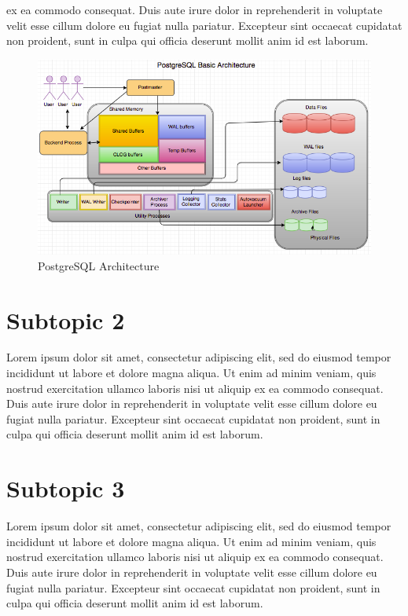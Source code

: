 \documentclass[a4paper,12 pt,oneside]{book}
\begin{document}
ex ea commodo consequat. Duis aute irure dolor in reprehenderit in voluptate velit esse cillum dolore eu fugiat nulla pariatur. Excepteur sint occaecat cupidatat non proident, sunt in culpa qui officia deserunt mollit anim id est laborum.

\begin{figure}[h]
    \centering
    \includegraphics[width=\textwidth]{images/pg.png}
    \caption{PostgreSQL Architecture}
    \label{fig:pg}
\end{figure}

\section{Subtopic 2}

Lorem ipsum dolor sit amet, consectetur adipiscing elit, sed do eiusmod tempor incididunt ut labore et dolore magna aliqua. Ut enim ad minim veniam, quis nostrud exercitation ullamco laboris nisi ut aliquip ex ea commodo consequat. Duis aute irure dolor in reprehenderit in voluptate velit esse cillum dolore eu fugiat nulla pariatur. Excepteur sint occaecat cupidatat non proident, sunt in culpa qui officia deserunt mollit anim id est laborum.

\section{Subtopic 3}

Lorem ipsum dolor sit amet, consectetur adipiscing elit, sed do eiusmod tempor incididunt ut labore et dolore magna aliqua. Ut enim ad minim veniam, quis nostrud exercitation ullamco laboris nisi ut aliquip ex ea commodo consequat. Duis aute irure dolor in reprehenderit in voluptate velit esse cillum dolore eu fugiat nulla pariatur. Excepteur sint occaecat cupidatat non proident, sunt in culpa qui officia deserunt mollit anim id est laborum.
\end{document}
